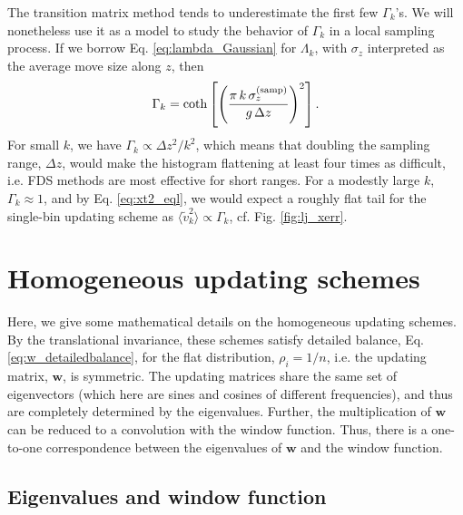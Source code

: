 \documentclass[preprint, superscriptaddress, floatfix]{revtex4-1}
\begin{document}
The transition matrix method
tends to underestimate
the first few $\Gamma_k$'s.
%
We will nonetheless use it as a model to
study the behavior of $\Gamma_k$
in a local sampling process.
%
If we borrow Eq. \eqref{eq:lambda_Gaussian}
for $\Lambda_k$,
with $\sigma_z$ interpreted as the average move size along $z$,
then
\begin{align}
\Gamma_k = \coth\left[
  \left(
    \frac{ \pi \, k \, \sigma_z^\mathrm{(samp)} } { g \, \Delta z}
  \right)^2
  \right].
  \notag
\end{align}
For small $k$,
we have $\Gamma_k \propto \Delta z^2/k^2$,\cite{bussi2006}
which means that doubling the sampling range, $\Delta z$,
would make the histogram flattening
at least four times as difficult,
i.e. FDS methods are most effective
for short ranges\cite{wang2001, wang2001pre}.
%
%
For a modestly large $k$,
$\Gamma_k \approx 1$,
and by Eq. \eqref{eq:xt2_eql},
we would expect a roughly flat tail
for the single-bin updating scheme
as $\langle \tilde v_k^2 \rangle \propto \Gamma_k$,
cf. Fig. \ref{fig:lj_xerr}.





\section{\label{sec:more_wband}
Homogeneous updating schemes
}


Here, we give some mathematical details
on the homogeneous updating schemes.
%
By the translational invariance,
these schemes
satisfy detailed balance,
Eq. \eqref{eq:w_detailedbalance},
for the flat distribution, $\rho_i = 1/n$,
i.e. the updating matrix, $\mathbf w$,
is symmetric.
%
The updating matrices
share the same set of eigenvectors
(which here are sines and cosines of different frequencies),
and thus are completely determined
by the eigenvalues.
%
Further, the multiplication of $\mathbf w$
can be reduced to a convolution with the window function.
%
Thus,
there is a one-to-one correspondence between
the eigenvalues of $\mathbf w$
and the window function.



\subsection{\label{sec:wband_eig}
Eigenvalues and window function}
\end{document}
